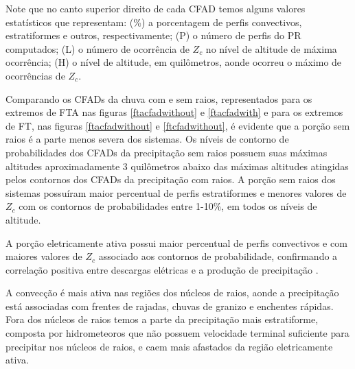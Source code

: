 Note que no canto superior direito de cada CFAD temos alguns valores estatísticos que representam: (\%)  a porcentagem de perfis convectivos, estratiformes e outros, respectivamente; (P)  o número de perfis do PR computados; (L)  o número de ocorrência de $Z_c$ no nível de altitude de máxima ocorrência; (H)  o nível de altitude, em quilômetros, aonde ocorreu o máximo de ocorrências de $Z_c$.

Comparando os CFADs da chuva com e sem raios, representados para os extremos de FTA nas figuras \ref{ftacfadwithout} e \ref{ftacfadwith} e para os extremos de FT, nas figuras \ref{ftacfadwithout} e \ref{ftcfadwithout}, é evidente que a porção sem raios é a parte menos severa dos sistemas. Os níveis de contorno de probabilidades dos CFADs da precipitação sem raios possuem suas máximas altitudes aproximadamente 3 quilômetros abaixo das máximas altitudes atingidas pelos contornos dos CFADs da precipitação com raios. A porção sem raios dos sistemas possuíram maior percentual de perfis estratiformes e menores valores de $Z_c$ com os contornos de probabilidades entre 1-10\%, em todos os níveis de altitude.

A porção eletricamente ativa possui maior percentual de perfis convectivos e com maiores valores de $Z_c$ associado aos contornos de probabilidade, confirmando a correlação positiva entre descargas elétricas e a produção de precipitação \cite{Petersen1998}.

A convecção é mais ativa nas regiões dos núcleos de raios, aonde a precipitação está associadas com frentes de rajadas, chuvas de granizo e enchentes rápidas. Fora dos núcleos de raios temos a parte da precipitação mais estratiforme, composta por hidrometeoros que não possuem velocidade terminal suficiente para precipitar nos núcleos de raios, e caem mais afastados da região eletricamente ativa.     %


